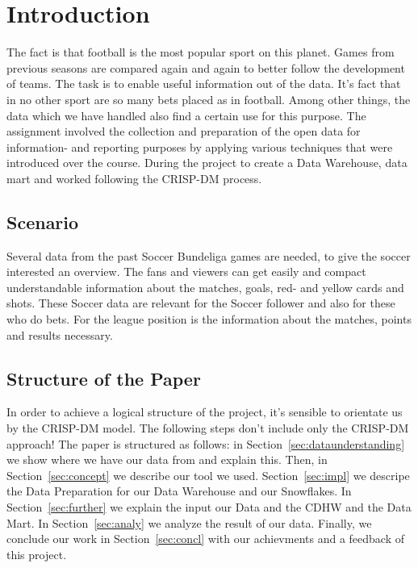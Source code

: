 \documentclass[11pt, journal]{IEEEtran}
\begin{document}


\section{Introduction}
\label{sec:intro}
The fact is that football is the most popular sport on this planet. Games from previous seasons are compared again and again to better follow the development of teams. 
The task is to enable useful information out of the data. It’s fact that in no other sport are so many bets placed as in football. Among other things, the data which we have handled also find a certain use for this purpose. The assignment involved the collection and preparation of the open data for information- and reporting purposes by applying various techniques that were introduced over the course. During the project to create a Data Warehouse, data mart and worked following the CRISP-DM process.

\subsection{Scenario} \label{subsec:scenario}
Several data from the past Soccer Bundeliga games are needed, to give the soccer interested an overview. The fans and viewers can get easily and compact understandable information about the matches, goals, red- and yellow cards and shots. These Soccer data are relevant for the Soccer follower and also for these who do bets. For the league position is the information about the matches, points and results necessary. 

\subsection{Structure of the Paper} \label{subsec:struct}
In order to achieve a logical structure of the project, it’s sensible to orientate us by the CRISP-DM model. The following steps don’t include only the CRISP-DM approach!
The paper is structured as follows: in Section~\ref{sec:dataunderstanding} we show where we have our data from and explain this. 
Then, in Section~\ref{sec:concept} we describe our tool we used. Section~\ref{sec:impl} we descripe the Data Preparation for our Data Warehouse and our Snowflakes. In Section~\ref{sec:further} we explain the input our Data and the CDHW and the Data Mart.  In Section~\ref{sec:analy} we analyze the result of our data. Finally, we conclude our work in Section~\ref{sec:concl} with our achievments and a feedback of this project.
\end{document}
